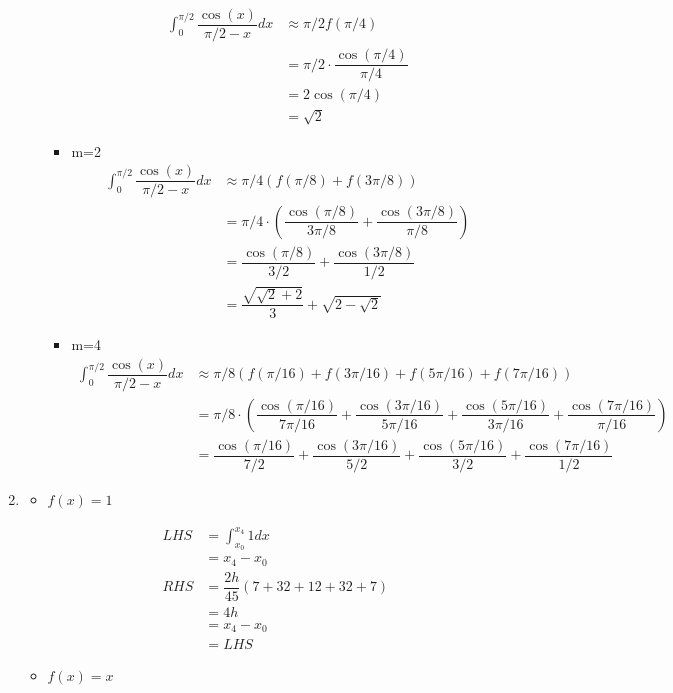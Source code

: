 \documentclass{article}
\begin{document}
\begin{enumerate}
\begin{enumerate}
\begin{itemize}
\begin{align*}
\int_0^{\pi/2} \dfrac{\cos(x)}{\pi/2-x} dx&\approx \pi/2 f(\pi/4)\\
&=\pi/2\cdot\dfrac{\cos(\pi/4)}{\pi/4}\\
&=2\cos(\pi/4)\\
&=\sqrt{2}
\end{align*}
\item m=2
\begin{align*}
\int_0^{\pi/2} \dfrac{\cos(x)}{\pi/2-x} dx&\approx \pi/4 (f(\pi/8)+f(3\pi/8))\\
&=\pi/4\cdot\left(\dfrac{\cos(\pi/8)}{3\pi/8}+\dfrac{\cos(3\pi/8)}{\pi/8}\right)\\
&=\dfrac{\cos(\pi/8)}{3/2}+\dfrac{\cos(3\pi/8)}{1/2}\\
&=\dfrac{\sqrt{\sqrt{2}+2}}{3}+\sqrt{2-\sqrt{2}}
\end{align*}
\item  m=4
\begin{align*}
\int_0^{\pi/2} \dfrac{\cos(x)}{\pi/2-x} dx&\approx \pi/8 (f(\pi/16)+f(3\pi/16)+f(5\pi/16)+f(7\pi/16))\\
&=\pi/8\cdot\left(\dfrac{\cos(\pi/16)}{7\pi/16}+\dfrac{\cos(3\pi/16)}{5\pi/16}+\dfrac{\cos(5\pi/16)}{3\pi/16}+\dfrac{\cos(7\pi/16)}{\pi/16}\right)\\
&=\dfrac{\cos(\pi/16)}{7/2}+\dfrac{\cos(3\pi/16)}{5/2}+\dfrac{\cos(5\pi/16)}{3/2}+\dfrac{\cos(7\pi/16)}{1/2}
\end{align*}
\end{itemize}
\end{enumerate}
\item
\begin{itemize}
\item  $f(x) =1$

\begin{align*}
LHS &=\int_{x_0}^{x_4} 1 dx\\
&=x_4-x_0\\
RHS &=\dfrac{2h}{45}(7+32+12+32+7)\\
&=4h\\
&=x_4-x_0\\&=LHS
\end{align*}


\item  $f(x) =x$


\end{itemize}
\end{enumerate}
\end{document}
